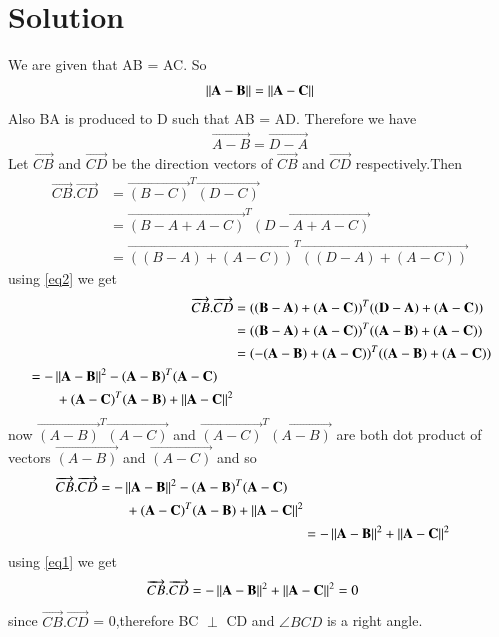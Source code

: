 \documentclass[journal,12pt,twocolumn]{IEEEtran}
\begin{document}
\section{\textbf{Solution}}
\renewcommand{\thefigure}{\arabic{figure}}
\begin{figure}[!h]
  \centering
  \caption{}
  \label{myfig}
\end{figure}
We are given that AB = AC. So
\begin{align}
  \left\lVert\mathbf{A-B}\right\rVert = \left\lVert\mathbf{A-C}\right\rVert \label{eq1}
\end{align}
Also BA is produced to D such that AB = AD. Therefore we have
\begin{align}
  \vec{A-B} = \vec{D-A} \label{eq2}
\end{align}
Let $\overrightarrow{CB}$ and $\overrightarrow{CD}$ be the direction vectors of $\vec{CB}$ and $\vec{CD}$ respectively.Then
\begin{align*}
  \overrightarrow{CB}.\overrightarrow{CD} &= \vec{(B-C)}^T\vec{(D-C)}\\
  &= \vec{(B-A+A-C)}^T\vec{(D-A+A-C)}\\
  &= \vec{((B-A)+(A-C))}^T\vec{((D-A)+(A-C))}
\end{align*}
using \eqref{eq2} we get
\begin{align*}
  \overrightarrow{CB}.\overrightarrow{CD} &= \mathbf{((B-A)+(A-C))}^T\mathbf{((D-A)+(A-C))}\\
  &= \mathbf{((B-A)+(A-C))}^T\mathbf{((A-B)+(A-C))}\\
  &= \mathbf{(-(A-B)+(A-C))}^T\mathbf{((A-B)+(A-C))}\\
  \begin{split}
    &= -\left\lVert\mathbf{A-B}\right\rVert^2-\mathbf{(A-B)}^T\mathbf{(A-C)}\\
       &\qquad +\mathbf{(A-C)}^T\mathbf{(A-B)}+\left\lVert\mathbf{A-C}\right\rVert^2
  \end{split}
\end{align*}
now $\vec{(A-B)}^T\vec{(A-C)}$ and $\vec{(A-C)}^T\vec{(A-B)}$ are both dot product of vectors $\vec{(A-B)}$ and $\vec{(A-C)}$ and so
\begin{align*}
  \begin{split}
    \overrightarrow{CB}.\overrightarrow{CD} &= -\left\lVert\mathbf{A-B}\right\rVert^2-\mathbf{(A-B)}^T\mathbf{(A-C)}\\
                                &\qquad +\mathbf{(A-C)}^T\mathbf{(A-B)}+\left\lVert\mathbf{A-C}\right\rVert^2
  \end{split}\\
  &= -\left\lVert\mathbf{A-B}\right\rVert^2+\left\lVert\mathbf{A-C}\right\rVert^2
\end{align*}
using \eqref{eq1} we get
\begin{align}
  \overrightarrow{CB}.\overrightarrow{CD} &= -\left\lVert\mathbf{A-B}\right\rVert^2+\left\lVert\mathbf{A-C}\right\rVert^2 = 0
\end{align}
since $\overrightarrow{CB}.\overrightarrow{CD}$ = 0,therefore BC $\perp$ CD and $\angle{BCD}$ is a right angle.
\end{document}

